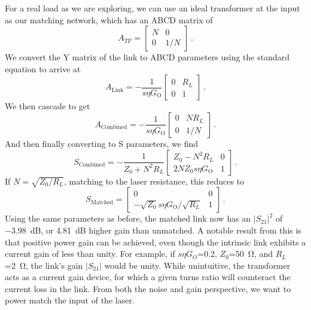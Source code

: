 For a real load as we are exploring, we can use an ideal transformer at the input as our matching network, which has an ABCD matrix of
\begin{equation}
    A_{TF} = \begin{bmatrix}
        N & 0\\0 & 1/N
    \end{bmatrix} \,.
\end{equation}
We convert the Y matrix of the link to ABCD parameters using the standard equation to arrive at
\begin{equation}
    A_\text{Link} = -\frac{1}{s\eta G_\text{O}}\begin{bmatrix}
        0 & R_L \\ 0 & 1
    \end{bmatrix} \,.
\end{equation}
We  then cascade to get
\begin{equation}
    A_\text{Combined} = -\frac{1}{s\eta G_\text{O}}\begin{bmatrix}
        0 & NR_L \\ 0 & 1/N
    \end{bmatrix} \,.
\end{equation}
And then finally converting to S parameters, we find
\begin{equation}
    S_\text{Combined} = -\frac{1}{Z_0+N^2R_L} \begin{bmatrix}
        Z_0-N^2R_L & 0 \\ 2NZ_0s\eta G_\text{O} & 1
    \end{bmatrix} \,.
\end{equation}
If $N=\sqrt{Z_0/R_L}$, matching to the laser resistance, this reduces to
\begin{equation}
    S_\text{Matched} = \begin{bmatrix}
        0 & 0 \\ -\sqrt{Z_0}s\eta G_\text{O}/\sqrt{R_L} & 1
    \end{bmatrix} \,.
    \label{eq:matched_rfof_s_params}
\end{equation}
Using the same parameters as before, the matched link now has an $|S_{21}|^2$ of \qty{-3.98}{\dB}, or \qty{4.81}{\dB} higher gain than unmatched.
A notable result from this is that positive power gain can be achieved, even though the intrinsic link exhibits a current gain of less than unity.
For example, if $s\eta G_O$\num{=0.2}, $Z_0$\qty{=50}{\ohm}, and $R_L$\qty{=2}{\ohm}, the link's gain $|S_{21}|$ would be unity.
While unintuitive, the transformer acts as a current gain device, for which a given turns ratio will counteract the current loss in the link.
From both the noise and gain perspective, we want to power match the input of the laser.

